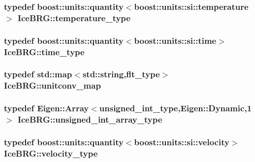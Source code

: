 \hypertarget{namespaceIceBRG_afc3df702762e93c9a692609f0389d8d3}{
\subsubsection[{temperature\-\_\-type}]{\setlength{\rightskip}{0pt plus 5cm}typedef boost\-::units\-::quantity$<$boost\-::units\-::si\-::temperature$>$ {\bf Ice\-B\-R\-G\-::temperature\-\_\-type}}}\label{namespaceIceBRG_afc3df702762e93c9a692609f0389d8d3}
\hypertarget{namespaceIceBRG_abf6c442a2e180ef52c5cefe18e47c327}{
\subsubsection[{time\-\_\-type}]{\setlength{\rightskip}{0pt plus 5cm}typedef boost\-::units\-::quantity$<$boost\-::units\-::si\-::time$>$ {\bf Ice\-B\-R\-G\-::time\-\_\-type}}}\label{namespaceIceBRG_abf6c442a2e180ef52c5cefe18e47c327}
\hypertarget{namespaceIceBRG_a7dff9bcf80d56e9e3fc9d9e25c89ae68}{
\subsubsection[{unitconv\-\_\-map}]{\setlength{\rightskip}{0pt plus 5cm}typedef std\-::map$<$std\-::string,{\bf flt\-\_\-type}$>$ {\bf Ice\-B\-R\-G\-::unitconv\-\_\-map}}}\label{namespaceIceBRG_a7dff9bcf80d56e9e3fc9d9e25c89ae68}
\hypertarget{namespaceIceBRG_ae27e6046fd8aeb0c4451b4836a03b31f}{
\subsubsection[{unsigned\-\_\-int\-\_\-array\-\_\-type}]{\setlength{\rightskip}{0pt plus 5cm}typedef Eigen\-::\-Array$<${\bf unsigned\-\_\-int\-\_\-type},Eigen\-::\-Dynamic,1$>$ {\bf Ice\-B\-R\-G\-::unsigned\-\_\-int\-\_\-array\-\_\-type}}}\label{namespaceIceBRG_ae27e6046fd8aeb0c4451b4836a03b31f}
\hypertarget{namespaceIceBRG_a34f8ef3b46f3408301e3c28197095eff}{
\subsubsection[{velocity\-\_\-type}]{\setlength{\rightskip}{0pt plus 5cm}typedef boost\-::units\-::quantity$<$boost\-::units\-::si\-::velocity$>$ {\bf Ice\-B\-R\-G\-::velocity\-\_\-type}}}\label{namespaceIceBRG_a34f8ef3b46f3408301e3c28197095eff}


